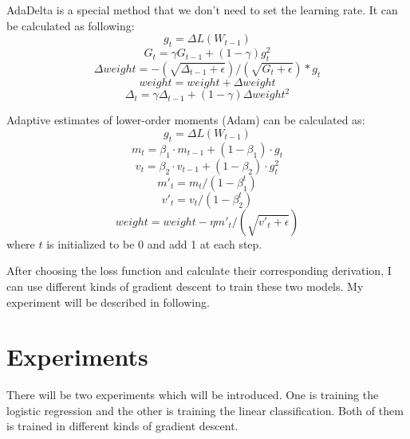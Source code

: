 \documentclass[journal, a4paper]{IEEEtran}
\begin{document}
AdaDelta is a special method that we don't need to set the learning rate. It can be calculated as following:
\begin{equation}
g_t=\Delta L(W_{t-1}) \label{eq18}
\end{equation}
\begin{equation}
G_t = \gamma G_{t-1} + (1-\gamma)g_t^2 \label{eq19}
\end{equation}
\begin{equation}
\Delta weight = -(\sqrt{\Delta_{t-1} + \epsilon}) / (\sqrt{G_{t} + \epsilon}) * g_t \label{eq20}
\end{equation}
\begin{equation}
weight = weight + \Delta weight \label{eq21}
\end{equation}
\begin{equation}
\Delta_{t}=\gamma \Delta_{t-1} + (1-\gamma)\Delta weight^2 \label{eq22}
\end{equation}

Adaptive estimates of lower-order moments (Adam) can be calculated as:
\begin{equation}
g_t=\Delta L(W_{t-1}) \label{eq23}
\end{equation}
\begin{equation}
m_t=\beta_1 \cdot m_{t-1} + (1-\beta_1) \cdot g_t \label{eq24}
\end{equation}
\begin{equation}
v_t=\beta_2 \cdot v_{t-1} + (1-\beta_2) \cdot g_t^2 \label{eq25}
\end{equation}
\begin{equation}
m'_t=m_t/(1-\beta_1^t) \label{eq26}
\end{equation}
\begin{equation}
v'_t=v_t/(1-\beta_2^t) \label{eq27}
\end{equation}
\begin{equation}
weight = weight - \eta m'_t / (\sqrt{v'_t+\epsilon})
\end{equation}
where $t$ is initialized to be 0 and add 1 at each step.

After choosing the loss function and calculate their corresponding derivation, I can use different kinds of gradient descent to train these two models. My experiment will be described in following.

\section{Experiments}
There will be two experiments which will be introduced. One is training the logistic regression and the other is training the linear classification. Both of them is trained in different kinds of gradient descent.
\end{document}
